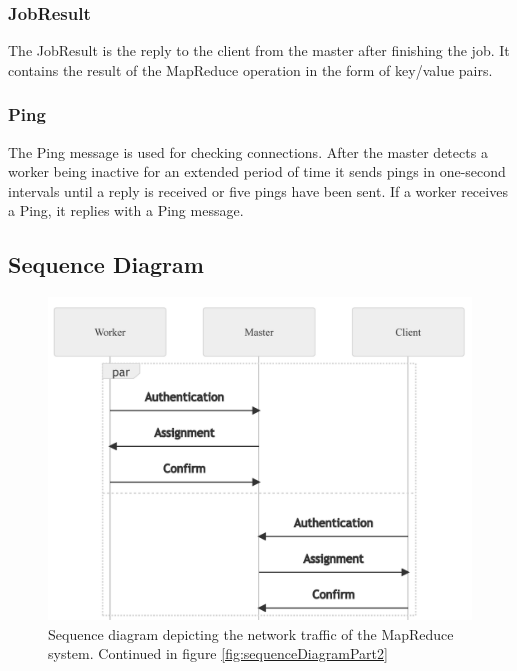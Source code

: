 \documentclass[12pt, letterpaper]{article}
\begin{document}
\subsubsection{JobResult}
The JobResult is the reply to the client from the master after finishing the job. It contains the result of the MapReduce operation in the form of key/value pairs.  

\subsubsection{Ping}
The Ping message is used for checking connections. After the master detects a worker being inactive for an extended period of time it sends pings in one-second intervals until a reply is received or five pings have been sent. If a worker receives a Ping, it replies with a Ping message.

\subsection{Sequence Diagram}

\begin{figure}[h]
	\centering
	\includegraphics[width=0.6\linewidth]{img/SequenceDiagramPart1}
	\caption{Sequence diagram depicting the network traffic of the MapReduce system. Continued in figure \ref{fig:sequenceDiagramPart2}}
	\label{fig:sequenceDiagramPart1}
\end{figure}
\end{document}
